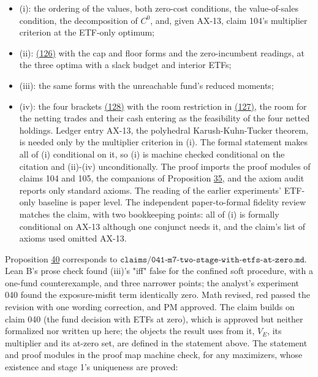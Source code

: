 \documentclass[11pt]{article}
\begin{document}
\begin{itemize}
  \item (i): the ordering of the values, both zero-cost conditions, the
  value-of-sales condition, the decomposition of \(C^0\), and, given AX-13,
  claim 104's multiplier criterion at the ETF-only optimum;
  \item (ii): \hyperref[eq:126]{(126)} with the cap and floor forms and the zero-incumbent
  readings, at the three optima with a slack budget and interior ETFs;
  \item (iii): the same forms with the unreachable fund's reduced moments;
  \item (iv): the four brackets \hyperref[eq:128]{(128)} with the room restriction in \hyperref[eq:127]{(127)},
  the room for the netting trades and their cash entering as the
  feasibility of the four netted holdings.
Ledger entry AX-13, the polyhedral Karush-Kuhn-Tucker theorem, is
needed only by the multiplier criterion in (i). The formal statement
makes all of (i) conditional on it, so (i) is machine checked
conditional on the citation and (ii)-(iv) unconditionally. The proof imports the proof modules
of claims 104 and 105, the companions of Proposition \hyperref[res:Proposition-35]{35}, and the axiom
audit reports only standard axioms. The reading of the earlier
experiments' ETF-only baseline is paper level. The independent
paper-to-formal fidelity review matches the claim, with two
bookkeeping points: all of (i) is formally conditional on AX-13
although one conjunct needs it, and the claim's list of axioms used
omitted AX-13.
\end{itemize}

Proposition \hyperref[res:Proposition-40]{40} corresponds to
\(\texttt{claims/041-m7-two-stage-with-etfs-at-zero.md}\). Lean B's prose
check found (iii)'s "iff" false for the confined soft procedure, with a
one-fund counterexample, and three narrower points; the analyst's
experiment 040 found the exposure-misfit term identically zero. Math
revised, red passed the revision with one wording correction, and PM
approved. The claim builds on claim 040 (the fund decision with ETFs
at zero), which is approved but neither formalized nor written up
here; the objects the result uses from it, \(V_E\), its multiplier and
its at-zero set, are defined in the statement above. The statement and
proof modules in the proof map machine check, for any maximizers,
whose existence and stage 1's uniqueness are proved:
\end{document}
